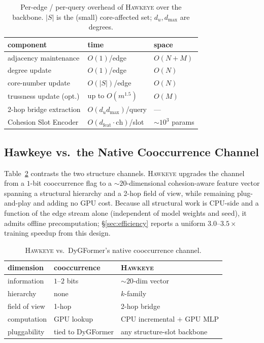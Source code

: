 \documentclass[sigconf,nonacm,review]{acmart}
\newcommand{\method}{\textsc{Hawkeye}\xspace}
\begin{document}
\begin{table}[t]
\caption{Per-edge / per-query overhead of \method over the backbone.
$|S|$ is the (small) core-affected set; $d_u,d_{\max}$ are degrees.}
\label{tab:complexity}
\centering\small
\setlength{\tabcolsep}{4pt}
\begin{tabular}{lll}
\toprule
component & time & space \\
\midrule
adjacency maintenance      & $O(1)$/edge          & $O(N{+}M)$ \\
degree update              & $O(1)$/edge          & $O(N)$ \\
core-number update         & $O(|S|)$/edge        & $O(N)$ \\
trussness update (opt.)    & up to $O(m^{1.5})$   & $O(M)$ \\
2-hop bridge extraction    & $O(d_u d_{\max})$/query & --- \\
Cohesion Slot Encoder      & $O(d_{\mathrm{feat}}\!\cdot\!\text{ch})$/slot & $\sim\!10^3$ params \\
\bottomrule
\end{tabular}
\end{table}

\subsection{Hawkeye vs.\ the Native Cooccurrence Channel}
Table~\ref{tab:vs} contrasts the two structure channels. \method upgrades the
channel from a $1$-bit cooccurrence flag to a $\sim\!20$-dimensional
cohesion-aware feature vector spanning a structural hierarchy and a 2-hop field
of view, while remaining plug-and-play and adding no GPU cost.
Because all structural work is CPU-side and a function of the edge stream
alone (independent of model weights and seed), it admits offline precomputation;
\S\ref{sec:efficiency} reports a uniform $3.0$--$3.5\times$ training speedup
from this design.

\begin{table}[t]
\caption{\method vs.\ DyGFormer's native cooccurrence channel.}
\label{tab:vs}
\centering\small
\setlength{\tabcolsep}{4pt}
\begin{tabular}{lll}
\toprule
dimension & cooccurrence & \method \\
\midrule
information      & $1$--$2$ bits        & $\sim\!20$-dim vector \\
hierarchy        & none                 & $k$-family \\
field of view    & 1-hop                & 2-hop bridge \\
computation      & GPU lookup           & CPU incremental $+$ GPU MLP \\
pluggability     & tied to DyGFormer    & any structure-slot backbone \\
\bottomrule
\end{tabular}
\end{table}
\end{document}
